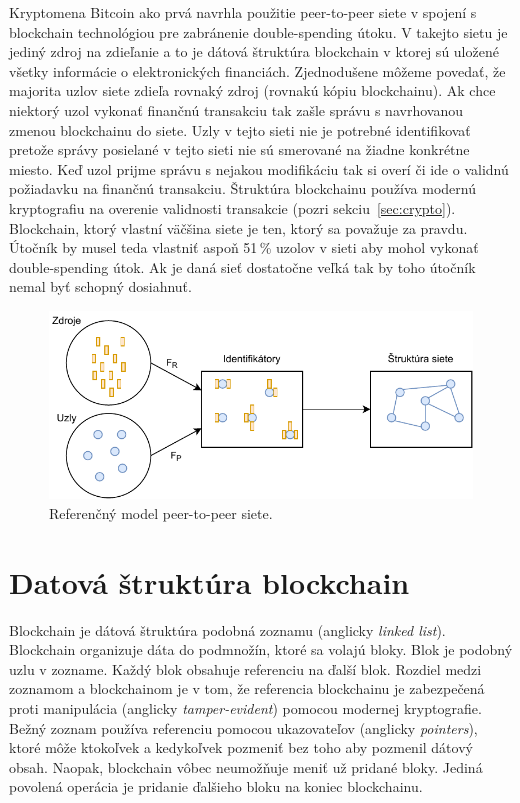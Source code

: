 Kryptomena Bitcoin ako prvá navrhla použitie peer-to-peer siete v spojení s blockchain technológiou pre zabránenie double-spending útoku. V takejto sietu je jediný zdroj na zdieľanie a to je dátová štruktúra blockchain v ktorej sú uložené všetky informácie o elektronických financiách. Zjednodušene môžeme povedať, že majorita uzlov siete zdieľa rovnaký zdroj (rovnakú kópiu blockchainu). Ak chce niektorý uzol vykonať finančnú transakciu tak zašle správu s navrhovanou zmenou blockchainu do siete. Uzly v tejto sieti nie je potrebné identifikovať pretože správy posielané v tejto sieti nie sú smerované na žiadne konkrétne miesto. Keď uzol prijme správu s nejakou modifikáciu tak si overí či ide o validnú požiadavku na finančnú transakciu. Štruktúra blockchainu používa modernú kryptografiu na overenie validnosti transakcie (pozri sekciu~\ref{sec:crypto}). Blockchain, ktorý vlastní väčšina siete je ten, ktorý sa považuje za pravdu. Útočník by musel teda vlastniť aspoň 51\,\% uzolov v sieti aby mohol vykonať double-spending útok. Ak je daná sieť dostatočne veľká tak by toho útočník nemal byť schopný dosiahnuť.~\cite{satoshiBitcoin}

\begin{figure}[bt]
	\centering
	\includegraphics[width=\textwidth]{obrazky-figures/p2p-ref-model.pdf}
	\caption{Referenčný model peer-to-peer siete.~\cite{p2pEssence}}
	\label{img:p2p-ref-model}
\end{figure}

\section{Datová štruktúra blockchain}\label{sec:data-struct-blockchain}
Blockchain je dátová štruktúra podobná zoznamu (anglicky \textit{linked list}). Blockchain organizuje dáta do podmnožín, ktoré sa volajú bloky. Blok je podobný uzlu v zozname. Každý blok obsahuje referenciu na ďalší blok. Rozdiel medzi zoznamom a blockchainom je v tom, že referencia blockchainu je zabezpečená proti manipulácia (anglicky \textit{tamper-evident}) pomocou modernej kryptografie. Bežný zoznam používa referenciu pomocou ukazovateľov (anglicky \textit{pointers}), ktoré môže ktokoľvek a kedykoľvek pozmeniť bez toho aby pozmenil dátový obsah. Naopak, blockchain vôbec neumožňuje meniť už pridané bloky. Jediná povolená operácia je pridanie ďalšieho bloku na koniec blockchainu.~\cite{horizenAcademy}

